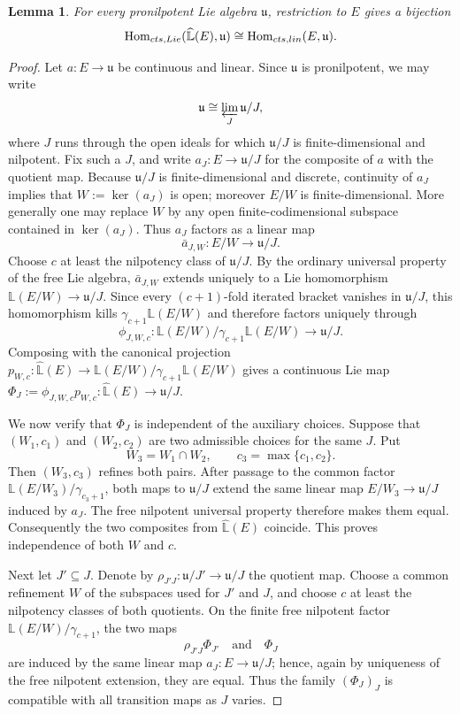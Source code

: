\documentclass[10pt,a4paper]{amsart}
\newtheorem{lemma}[theorem]{Lemma}
\newcommand{\Hom}{\operatorname{Hom}}
\newcommand{\LL}{\widehat{\mathbb L}}
\begin{document}
\begin{lemma}\label{lem:universal}
For every pronilpotent Lie algebra $\mathfrak u$, restriction to $E$ gives
a bijection
\[
 \Hom_{\rm cts,Lie}(\LL(E),\mathfrak u)
 \cong \Hom_{\rm cts,lin}(E,\mathfrak u).
\]
\end{lemma}
\begin{proof}
Let $a:E\to\mathfrak u$ be continuous and linear.  Since
$\mathfrak u$ is pronilpotent, we may write
\[
 \mathfrak u\cong\varprojlim_J \mathfrak u/J,
\]
where $J$ runs through the open ideals for which $\mathfrak u/J$ is
finite-dimensional and nilpotent.  Fix such a $J$, and write
$a_J:E\to\mathfrak u/J$ for the composite of $a$ with the quotient map.
Because $\mathfrak u/J$ is finite-dimensional and discrete, continuity of
$a_J$ implies that $W:=\ker(a_J)$ is open; moreover $E/W$ is
finite-dimensional.  More generally one may replace $W$ by any open
finite-codimensional subspace contained in $\ker(a_J)$.  Thus $a_J$
factors as a linear map
\[
 \bar a_{J,W}:E/W\longrightarrow\mathfrak u/J.
\]
Choose $c$ at least the nilpotency class of $\mathfrak u/J$.  By the
ordinary universal property of the free Lie algebra, $\bar a_{J,W}$
extends uniquely to a Lie homomorphism $\mathbb L(E/W)\to\mathfrak u/J$.
Since every $(c+1)$-fold iterated bracket vanishes in $\mathfrak u/J$,
this homomorphism kills $\gamma_{c+1}\mathbb L(E/W)$ and therefore factors
uniquely through
\[
 \phi_{J,W,c}:\mathbb L(E/W)/\gamma_{c+1}\mathbb L(E/W)
       \longrightarrow\mathfrak u/J.
\]
Composing with the canonical projection
$p_{W,c}:\LL(E)\to
\mathbb L(E/W)/\gamma_{c+1}\mathbb L(E/W)$ gives a continuous Lie map
$\Phi_J:=\phi_{J,W,c}p_{W,c}:\LL(E)\to\mathfrak u/J$.

We now verify that $\Phi_J$ is independent of the auxiliary choices.
Suppose that $(W_1,c_1)$ and $(W_2,c_2)$ are two admissible choices for the
same $J$.  Put
\[
 W_3=W_1\cap W_2,\qquad c_3=\max\{c_1,c_2\}.
\]
Then $(W_3,c_3)$ refines both pairs.  After passage to the common factor
$\mathbb L(E/W_3)/\gamma_{c_3+1}$, both maps to $\mathfrak u/J$ extend
the same linear map $E/W_3\to\mathfrak u/J$ induced by $a_J$.
The free nilpotent universal property therefore makes them equal.
Consequently the two composites from $\LL(E)$ coincide.  This proves
independence of both $W$ and $c$.

Next let $J'\subseteq J$.  Denote by
$\rho_{J'J}:\mathfrak u/J'\to\mathfrak u/J$ the quotient map.  Choose a
common refinement $W$ of the subspaces used for $J'$ and $J$, and choose
$c$ at least the nilpotency classes of both quotients.  On the finite free
nilpotent factor $\mathbb L(E/W)/\gamma_{c+1}$, the two maps
\[
 \rho_{J'J}\Phi_{J'}
 \quad\text{and}\quad
 \Phi_J
\]
are induced by the same linear map $a_J:E\to\mathfrak u/J$; hence, again
by uniqueness of the free nilpotent extension, they are equal.  Thus the
family $(\Phi_J)_J$ is compatible with all transition maps as $J$ varies.


\end{proof}
\end{document}
